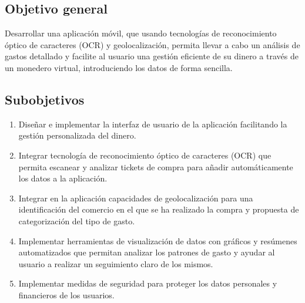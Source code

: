 \subsection{Objetivo general}
Desarrollar una aplicación móvil, que usando tecnologías de reconocimiento
óptico de caracteres (OCR) y geolocalización, permita llevar a cabo un 
análisis de gastos detallado y facilite al usuario una gestión eficiente de su dinero
a través de un monedero virtual, introduciendo los datos de 
forma sencilla.

\subsection{Subobjetivos}
\begin{enumerate}
    \item Diseñar e implementar la interfaz de usuario de la aplicación facilitando
        la gestión personalizada del dinero.
    \item Integrar tecnología de reconocimiento óptico de caracteres (OCR) que 
        permita escanear y analizar tickets de compra para añadir automáticamente 
        los datos a la aplicación.
    \item Integrar en la aplicación capacidades de geolocalización para una 
        identificación del comercio en el que se ha realizado la compra y 
         propuesta de categorización del tipo de gasto.     
    \item Implementar herramientas de visualización de datos con gráficos y resúmenes 
        automatizados que permitan analizar los patrones de gasto y ayudar al usuario 
        a realizar un seguimiento claro de los mismos.
    \item Implementar medidas de seguridad para proteger los datos personales y 
        financieros de los usuarios.
    
\end{enumerate}